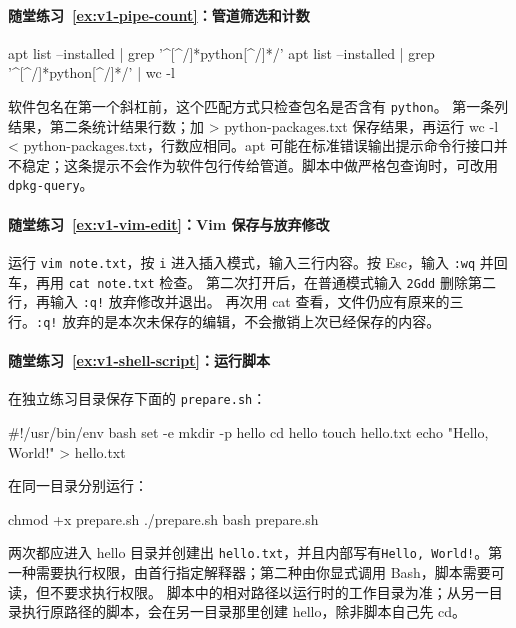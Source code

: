 \paragraph*{随堂练习~\ref{ex:v1-pipe-count}：管道筛选和计数}
\begin{solution}

\begin{tbash}
apt list --installed | grep '^[^/]*python[^/]*/'
apt list --installed | grep '^[^/]*python[^/]*/' | wc -l
\end{tbash}

软件包名在第一个斜杠前，这个匹配方式只检查包名是否含有 \texttt{python}。
第一条列结果，第二条统计结果行数；加 > python-packages.txt 保存结果，再运行 wc -l < python-packages.txt，行数应相同。apt 可能在标准错误输出提示命令行接口并不稳定；这条提示不会作为软件包行传给管道。脚本中做严格包查询时，可改用 \texttt{dpkg-query}。
\end{solution}

\paragraph*{随堂练习~\ref{ex:v1-vim-edit}：Vim 保存与放弃修改}
\begin{solution}
运行 \texttt{vim note.txt}，按 \texttt{i} 进入插入模式，输入三行内容。按 Esc，输入 \texttt{:wq} 并回车，再用 \texttt{cat note.txt} 检查。
第二次打开后，在普通模式输入 \texttt{2Gdd} 删除第二行，再输入 \texttt{:q!} 放弃修改并退出。
再次用 cat 查看，文件仍应有原来的三行。\texttt{:q!} 放弃的是本次未保存的编辑，不会撤销上次已经保存的内容。
\end{solution}


\paragraph*{随堂练习~\ref{ex:v1-shell-script}：运行脚本}
\begin{solution}
在独立练习目录保存下面的 \texttt{prepare.sh}：

\begin{tbash}
#!/usr/bin/env bash
set -e
mkdir -p hello
cd hello
touch hello.txt
echo "Hello, World!" > hello.txt
\end{tbash}

在同一目录分别运行：

\begin{tbash}
chmod +x prepare.sh
./prepare.sh
bash prepare.sh
\end{tbash}

两次都应进入 hello 目录并创建出 \texttt{hello.txt}，并且内部写有\texttt{Hello, World!}。第一种需要执行权限，由首行指定解释器；第二种由你显式调用 Bash，脚本需要可读，但不要求执行权限。
脚本中的相对路径以运行时的工作目录为准；从另一目录执行原路径的脚本，会在另一目录那里创建 hello，除非脚本自己先 cd。
\end{solution}

